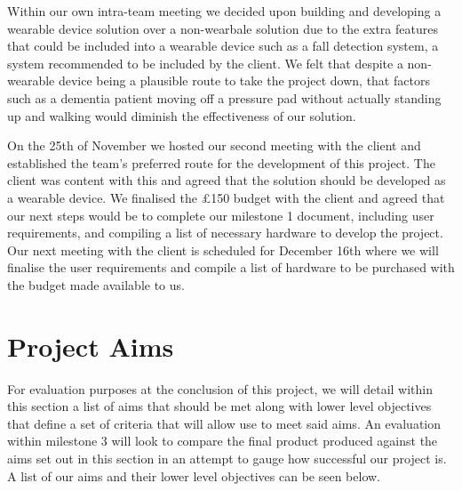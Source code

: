         Within our own intra-team meeting we decided upon building and developing a wearable device solution over a
        non-wearbale solution due to the extra features that could be included into a wearable device such as a fall
        detection system, a system recommended to be included by the client. We felt that despite a non-wearable device
        being a plausible route to take the project down, that factors such as a dementia patient moving off a pressure
        pad without actually standing up and walking would diminish the effectiveness of our solution.

        On the 25th of November we hosted our second meeting with the client and established the team's preferred route
        for the development of this project. The client was content with this and agreed that the solution should be
        developed as a wearable device. We finalised the £150 budget with the client and agreed that our next steps
        would be to complete our milestone 1 document, including user requirements, and compiling a list of necessary
        hardware to develop the project. Our next meeting with the client is scheduled for December 16th where we will
        finalise the user requirements and compile a list of hardware to be purchased with the budget made available to
        us.

    \section{Project Aims}
        For evaluation purposes at the conclusion of this project, we will detail within this section a list of aims
        that should be met along with lower level objectives that define a set of criteria that will allow use to meet
        said aims. An evaluation within milestone 3 will look to compare the final product produced against the aims set
        out in this section in an attempt to gauge how successful our project is. A list of our aims and their lower
        level objectives can be seen below.

